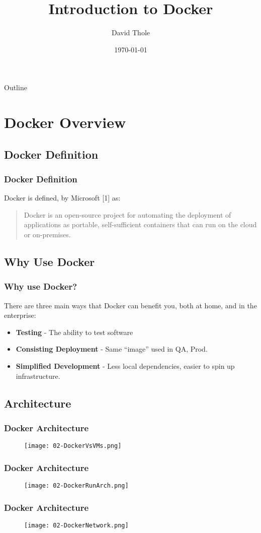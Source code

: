 \documentclass{beamer}
\begin{document}
\title{Introduction to Docker}
\author{David Thole}
\date{\today} 
\begin{frame}
  \titlepage
\end{frame}

\begin{frame}{Outline}
  \tableofcontents
\end{frame} 


\section{Docker Overview}
\subsection{Docker Definition}
\begin{frame}\frametitle{Docker Definition}
  Docker is defined, by Microsoft \small{[1]} as:
  \begin{quote}
    Docker is an open-source project for automating the deployment of applications as portable, self-sufficient containers that can run on the cloud or on-premises.
  \end{quote}
\end{frame}
\subsection{Why Use Docker}
\begin{frame}\frametitle{Why use Docker?}
  There are three main ways that Docker can benefit you, both at home, and in the enterprise:
  \begin{itemize}
  \item \textbf{Testing} - The ability to test software
  \item \textbf{Consisting Deployment} - Same ``image'' used in QA, Prod.
  \item \textbf{Simplified Development} - Less local dependencies, easier to spin up infrastructure.
  \end{itemize}
\end{frame}
\subsection{Architecture}
\begin{frame}\frametitle{Docker Architecture}
  \begin{figure}
    \texttt{[image: 02-DockerVsVMs.png]}
  \end{figure}
\end{frame}
\begin{frame}\frametitle{Docker Architecture}
  \begin{figure}
    \texttt{[image: 02-DockerRunArch.png]}
  \end{figure}
\end{frame}
\begin{frame}\frametitle{Docker Architecture}
  \begin{figure}
    \texttt{[image: 02-DockerNetwork.png]}
  \end{figure}
\end{frame}
\end{document}
